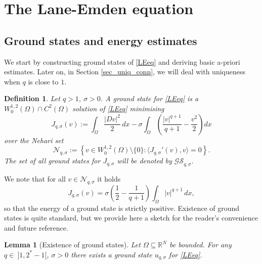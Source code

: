 \documentclass[12pt]{amsart}
\numberwithin{equation}{section}
\theoremstyle{plain}
\newtheorem{lemma}[theorem]{Lemma}
\theoremstyle{plain}
\theoremstyle{plain}
\newtheorem{definition}[theorem]{Definition}
\theoremstyle{definition}
\newcommand{\R}{{\mathbb R}}
\newcommand{\beq}{\begin{equation}}
\newcommand{\eeq}{\end{equation}}
\begin{document}
\section{The Lane-Emden equation}
\label{sec_LE}


\subsection{Ground states and energy estimates} 

We start by constructing ground states of \eqref{LEeq} and deriving basic a-priori estimates. 
Later on, in Section \ref{sec_uniq_conn}, we will deal with uniqueness when $q$ is close to $1$.

\begin{definition}\label{def_gs_LEeq}
Let $q>1$, $\sigma>0$. A {\em ground state} for \eqref{LEeq} is a $ W^{1,2}_0(\Omega)\cap C^2(\Omega)$ solution of \eqref{LEeq} minimising
\[
J_{q, \sigma}(v):=\int_\Omega \frac{|D v|^2}{2}\, dx - \sigma \int_\Omega \left(\frac{|v|^{q+1}}{q+1}-\frac{v^2}{2}\right) dx
\]
 over the Nehari set
\[
{\mathcal N}_{q, \sigma}:=\left\{v\in W^{1, 2}_0(\Omega)\setminus \{0\}: \langle J_{q, \sigma}'(v), v\rangle=0\right\}.
\]
The set of all ground states for $J_{q, \sigma}$ will be denoted by $\mathcal{GS}_{q, \sigma}$.
\end{definition}
 
 We note that for all $v\in {\mathcal N}_{q, \sigma}$ it holds
 \beq
 \label{Neq}
 J_{q, \sigma}(v)=\sigma \left(\frac{1}{2}-\frac{1}{q+1}\right)\int_\Omega |v|^{q+1}\, dx,
 \eeq
 so that the energy of a ground state is strictly positive. 
Existence of ground states is quite standard, but we provide here a sketch for the reader's convenience and future reference.
 
\begin{lemma}[Existence of ground states]
\label{lem_esist_solu}
Let $\Omega\subseteq \R^N$ be bounded. For any $q\in \ ]1, 2^*-1[$, $\sigma>0$ there exists a ground state $u_{q, \sigma}$ for \eqref{LEeq}.
\end{lemma}
 
\end{document}
